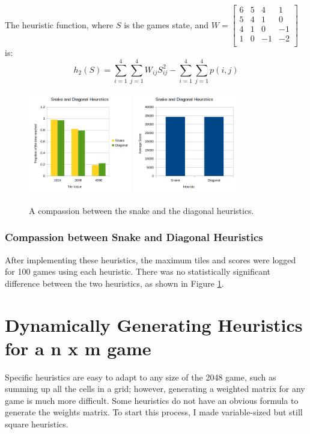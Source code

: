 \documentclass{article}
\begin{document}
The heuristic function, where $S$ is the games state, and
$
W=\begin{bmatrix}
    6&5&4&1\\
    5&4&1&0\\
    4&1&0&-1\\
    1&0&-1& -2\\
\end{bmatrix}
$ is:
\[
    h_2(S)=\sum_{i=1}^{4}\sum_{j=1}^{4}W_{ij}S_{ij}^2 - \sum_{i=1}^{4}\sum_{j=1}^{4}p(i,j)
\]
\begin{figure}
    \centering
    \includegraphics[width=0.4\textwidth]{SnakeToDiagonal.png}
    \includegraphics[width=0.4\textwidth]{SnakeToDiagonalScore.png}
    \caption{A compassion between the snake and the diagonal heuristics.}
    \label{fig:SnakeVDiagonal}
\end{figure}
\subsubsection{Compassion between Snake and Diagonal Heuristics}
After implementing these heuristics, the maximum tiles and scores were logged for 100 games using each heuristic. There was no statistically significant difference between the two heuristics, as shown in Figure \ref{fig:SnakeVDiagonal}.


\section{Dynamically Generating Heuristics for a n x m game}
Specific heuristics are easy to adapt to any size of the 2048 game, such as summing up all the cells in a grid; however, generating a weighted matrix for any game is much more difficult. Some heuristics do not have an obvious formula to generate the weights matrix. To start this process,  I made variable-sized but still square heuristics.
\end{document}
